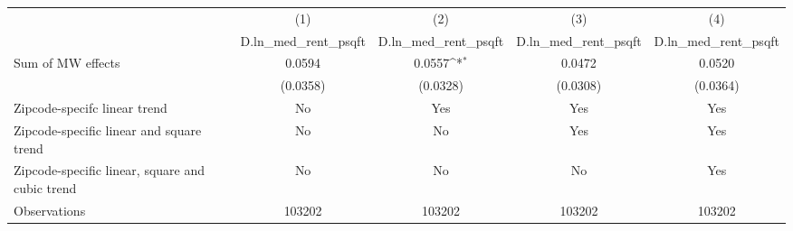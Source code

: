 {
\def\sym#1{\ifmmode^{#1}\else\(^{#1}\)\fi}
\begin{tabular}{l*{4}{c}}
\hline\hline
          &\multicolumn{1}{c}{(1)}&\multicolumn{1}{c}{(2)}&\multicolumn{1}{c}{(3)}&\multicolumn{1}{c}{(4)}\\
          &\multicolumn{1}{c}{D.ln\_med\_rent\_psqft}&\multicolumn{1}{c}{D.ln\_med\_rent\_psqft}&\multicolumn{1}{c}{D.ln\_med\_rent\_psqft}&\multicolumn{1}{c}{D.ln\_med\_rent\_psqft}\\
\hline
Sum of MW effects&   0.0594         &   0.0557\sym{*}  &   0.0472         &   0.0520         \\
          & (0.0358)         & (0.0328)         & (0.0308)         & (0.0364)         \\
\hline
Zipcode-specifc linear trend&       No         &      Yes         &      Yes         &      Yes         \\
Zipcode-specific linear and square trend&       No         &       No         &      Yes         &      Yes         \\
Zipcode-specific linear, square and cubic trend&       No         &       No         &       No         &      Yes         \\
Observations&   103202         &   103202         &   103202         &   103202         \\
\hline\hline
\end{tabular}
}
